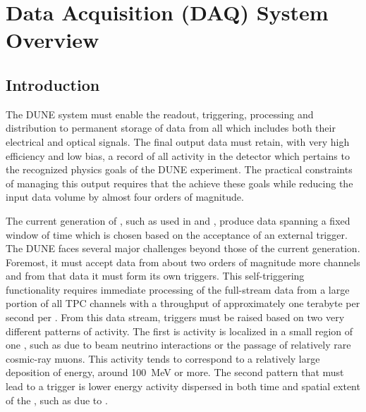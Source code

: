 \section{Data Acquisition (DAQ) System Overview}
\label{sec:fd-daq-ov}


\subsection{Introduction}
\label{sec:fd-daq-intro}

The DUNE   system must enable the readout,
triggering, processing and distribution to permanent storage of data
from all  which includes both their electrical
 and optical  signals.  
The final output data must retain, with very high efficiency and low
bias, a record of all activity in the detector which pertains to the
recognized physics goals of the DUNE experiment. 
The practical constraints of managing this output requires that the
 achieve these goals while reducing the input data volume by almost four
orders of magnitude.

The current generation of  , such as used in
 and \microboone, produce data spanning a fixed window of
time which is chosen based on the acceptance of an external trigger. 
The DUNE  faces several major challenges beyond those of the
current generation. 
Foremost, it must accept data from about two orders of magnitude more
channels and from that data it must form its own triggers.
This self-triggering functionality requires immediate processing of
the full-stream data from a large portion of all TPC channels with a
throughput of approximately one terabyte per second per
. 
From this data stream, triggers must be raised based on two very
different patterns of activity. 
The first is activity %
is localized in a small region of one
, such as due to beam neutrino interactions or the
passage of relatively rare cosmic-ray muons. 
This activity tends to correspond to a relatively large deposition of
energy, around \SI{100}{\MeV} or more. 
The second pattern that must lead to a trigger is lower energy activity
dispersed in both time and spatial extent of the , such as due to
.

